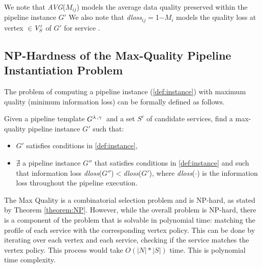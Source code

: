 We note that \emph{AVG}($M_{ij}$) models the average data quality preserved within the pipeline instance $G'$
We also note that \textit{dloss}$_{ij}$$=$1$-$$M_i$ models the quality loss at vertex $\in$$V'_S$ of $G'$ for service . 

\subsection{NP-Hardness of the Max-Quality Pipeline Instantiation Problem}\label{sec:nphard}
The problem of computing a pipeline instance (\cref{def:instance}) with maximum quality (minimum information loss) can be formally defined as follows.

\begin{definition}\label{def:MaXQualityInstance}
  Given a pipeline template $G^{\lambda\,,\gamma\,}$ and a set $S^c$ of candidate services, find a max-quality pipeline instance $G'$ such that:
  \begin{itemize}
    \item $G'$ satisfies conditions in \cref{def:instance},
    \item $\nexists$ a pipeline instance $G''$ that satisfies conditions in \cref{def:instance} and such that information loss \textit{dloss}($G''$)$<$\textit{dloss}($G'$), where \textit{dloss}($\cdot$) is the information loss throughout the pipeline execution.
  \end{itemize}
\end{definition}

The Max Quality \problem is a combinatorial selection problem and is NP-hard, as stated by Theorem \cref{theorem:NP}. However, while the overall problem is NP-hard, there is a component of the problem that is solvable in polynomial time: matching the profile of each service with the corresponding vertex policy. This can be done by iterating over each vertex and each service, checking if the service matches the vertex policy. This process would take $O(|N|*|S|)$ time. This is polynomial time complexity.

